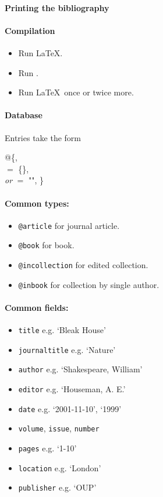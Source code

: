 \paragraph{Printing the bibliography}
\begin{pseudoverb}
\end{pseudoverb}

\paragraph{Compilation}
\begin{itemize}
\item Run \LaTeX.
\item Run .
\item Run \LaTeX\ once or twice more.
\end{itemize}

\paragraph{Database} Entries take the form
\begin{pseudoverb}
@\{,\\
  $=$ \{\}, \\
 \emph{or}  $=$ "",
 \}
\end{pseudoverb}

\paragraph{Common types:}
\begin{itemize}
\item \texttt{@article} for journal article.
\item \texttt{@book} for book.
\item \texttt{@incollection} for edited collection.
\item \texttt{@inbook} for collection by single author.
\end{itemize}

\paragraph{Common fields:}
\begin{itemize}
\item \texttt{title} e.g. `Bleak House'
\item \texttt{journaltitle} e.g. `Nature'
\item \texttt{author} e.g. `Shakespeare, William'
\item \texttt{editor} e.g. `Houseman, A. E.'
\item \texttt{date} e.g. `2001-11-10', `1999'
\item \texttt{volume}, \texttt{issue}, \texttt{number}
\item \texttt{pages} e.g. `1-10'
\item \texttt{location} e.g. `London'
\item \texttt{publisher} e.g. `OUP'
\end{itemize}

